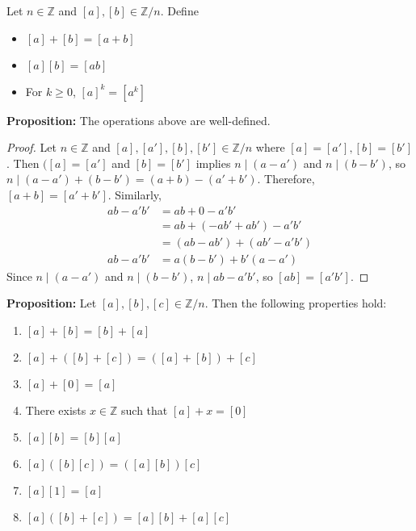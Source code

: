 \documentclass [12pt] {article}
\newcommand{\Z}{\mathbb{Z}}
\newenvironment{definition}[1]{\begin{tcolorbox}[title={Definition: #1},colback=green!5!white,colframe=black!75!green]}{\end{tcolorbox}}
\renewcommand{\bf}[1]{\textbf{{#1}}}
\begin{document}
\begin{definition}{Operations on $\Z/n$}
    Let $n \in \Z$ and $[a], [b] \in \Z/n$. Define
    \begin{itemize}[label=$\to$]
        \item $[a] + [b] = [a + b]$
        \item $[a][b] = [ab]$
        \item For $k \geq 0$, $[a]^k = [a^k]$
    \end{itemize}
\end{definition}
\bf{Proposition:} The operations above are well-defined.
\begin{proof}
    Let $n \in \Z$ and $[a], [a'], [b], [b'] \in \Z/n$ where $[a] = [a'], [b] = [b']$. Then
    $([a] = [a']$ and $[b] = [b']$ implies $n \mid (a - a')$ and $n \mid (b - b')$, so 
    $n \mid (a - a') + (b - b') = (a + b) - (a' + b')$. Therefore, $[a + b] = [a' + b']$. Similarly,
    \begin{align*}
        ab - a'b' &= ab + 0 - a'b' \\
                  &= ab + (-ab' + ab') - a'b' \\ 
                  &= (ab - ab') + (ab' - a'b') \\
        ab - a'b' &= a(b - b') + b'(a - a')
    \end{align*}
    Since $n \mid (a - a')$ and $n \mid (b - b')$, $n \mid ab - a'b'$, so $[ab] = [a'b']$.
\end{proof}
\bf{Proposition:} Let $[a], [b], [c] \in \Z/n$. Then the following properties hold:
\begin{enumerate}[label=(\arabic*)]
    \item $[a] + [b] = [b] + [a]$
    \item $[a] + ([b] + [c]) = ([a] + [b]) + [c]$
    \item $[a] + [0] = [a]$
    \item There exists $x \in \Z$ such that $[a] + x = [0]$
    \item $[a][b] = [b][a]$
    \item $[a] ([b][c]) = ([a][b]) [c]$
    \item $[a][1] = [a]$
    \item $[a] ([b] + [c]) = [a][b] + [a][c]$
\end{enumerate}
\newpage
\end{document}
